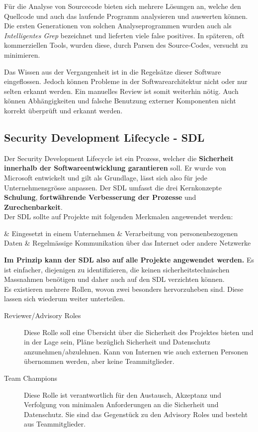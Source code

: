 Für die Analyse von Sourcecode bieten sich mehrere Lösungen an, welche den Quellcode und auch das laufende Programm analysieren und auswerten können. Die ersten Generationen von solchen Analyseprogrammen wurden auch als \textit{Intelligentes Grep} bezeichnet und lieferten viele false positives. In späteren, oft kommerziellen Tools, wurden diese, durch Parsen des Source-Codes, versucht zu minimieren.

Das Wissen aus der Vergangenheit ist in die Regelsätze dieser Software eingeflossen. Jedoch können Probleme in der Softwarearchitektur nicht oder nur selten erkannt werden. Ein manuelles Review ist somit weiterhin nötig. Auch können Abhängigkeiten und falsche Benutzung externer Komponenten nicht korrekt überprüft und erkannt werden.

\subsection{Security Development Lifecycle - SDL}

Der Security Development Lifecycle ist ein Prozess, welcher die \textbf{Sicherheit innerhalb der Softwareentwicklung garantieren} soll. Er wurde von Microsoft entwickelt und gilt als Grundlage, lässt sich also für jede Unternehmensgrösse anpassen. Der SDL umfasst die drei Kernkonzepte \textbf{Schulung}, \textbf{fortwährende Verbesserung der Prozesse} und \textbf{Zurechenbarkeit}.\\
Der SDL sollte auf Projekte mit folgenden Merkmalen angewendet werden:
\begin{easylist}[itemize]
	& Eingesetzt in einem Unternehmen
	& Verarbeitung von personenbezogenen Daten
	& Regelmässige Kommunikation über das Internet oder andere Netzwerke
\end{easylist}
\textbf{Im Prinzip kann der SDL also auf alle Projekte angewendet werden.} Es ist einfacher, diejenigen zu identifizieren, die keinen sicherheitstechnischen Massnahmen benötigen und daher auch auf den SDL verzichten können.\\
Es existieren mehrere Rollen, wovon zwei besonders hervorzuheben sind. Diese lassen sich wiederum weiter unterteilen.
\begin{description}
	\item[Reviewer/Advisory Roles] Diese Rolle soll eine Übersicht über die Sicherheit des Projektes bieten und in der Lage sein, Pläne bezüglich Sicherheit und Datenschutz anzunehmen/abzulehnen. Kann von Internen wie auch externen Personen übernommen werden, aber keine Teammitglieder.
	\item[Team Champions] Diese Rolle ist verantwortlich für den Austausch, Akzeptanz und Verfolgung von minimalen Anforderungen an die Sicherheit und Datenschutz. Sie sind das Gegenstück zu den Advisory Roles und besteht aus Teammitglieder.
\end{description}

